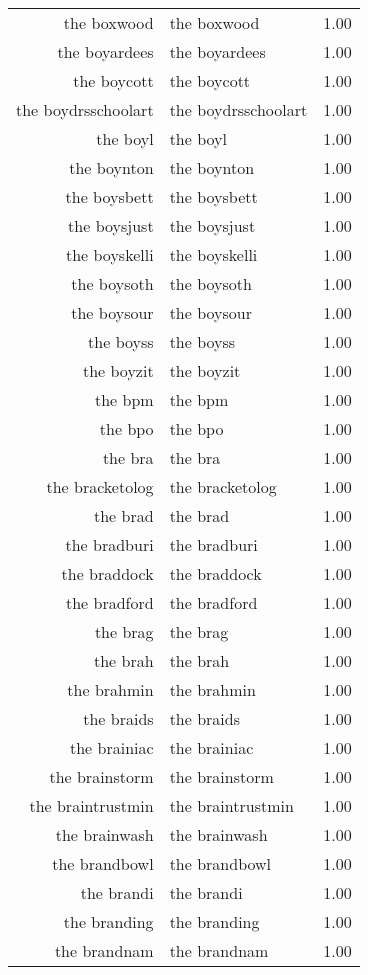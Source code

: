 \begin{table}[ht]
\begin{tabular}{rlr}
  the boxwood & the boxwood & 1.00 \\ 
  the boyardees & the boyardees & 1.00 \\ 
  the boycott & the boycott & 1.00 \\ 
  the boydrsschoolart & the boydrsschoolart & 1.00 \\ 
  the boyl & the boyl & 1.00 \\ 
  the boynton & the boynton & 1.00 \\ 
  the boysbett & the boysbett & 1.00 \\ 
  the boysjust & the boysjust & 1.00 \\ 
  the boyskelli & the boyskelli & 1.00 \\ 
  the boysoth & the boysoth & 1.00 \\ 
  the boysour & the boysour & 1.00 \\ 
  the boyss & the boyss & 1.00 \\ 
  the boyzit & the boyzit & 1.00 \\ 
  the bpm & the bpm & 1.00 \\ 
  the bpo & the bpo & 1.00 \\ 
  the bra & the bra & 1.00 \\ 
  the bracketolog & the bracketolog & 1.00 \\ 
  the brad & the brad & 1.00 \\ 
  the bradburi & the bradburi & 1.00 \\ 
  the braddock & the braddock & 1.00 \\ 
  the bradford & the bradford & 1.00 \\ 
  the brag & the brag & 1.00 \\ 
  the brah & the brah & 1.00 \\ 
  the brahmin & the brahmin & 1.00 \\ 
  the braids & the braids & 1.00 \\ 
  the brainiac & the brainiac & 1.00 \\ 
  the brainstorm & the brainstorm & 1.00 \\ 
  the braintrustmin & the braintrustmin & 1.00 \\ 
  the brainwash & the brainwash & 1.00 \\ 
  the brandbowl & the brandbowl & 1.00 \\ 
  the brandi & the brandi & 1.00 \\ 
  the branding & the branding & 1.00 \\ 
  the brandnam & the brandnam & 1.00 \\ 

\end{tabular}
\end{table}
